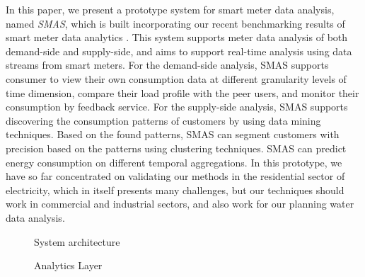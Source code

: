 \documentclass{sig-alternate}
\begin{document}
In this paper, we present a prototype system for smart meter data analysis, named {\em SMAS}, which is built incorporating our recent benchmarking results of smart meter data analytics \cite{benchmarking}. This system supports meter data analysis of both demand-side and supply-side, and aims to support real-time analysis using  data streams from smart meters.  For the demand-side analysis, SMAS supports  consumer to view their own consumption data at different granularity levels of time  dimension, compare their load profile with the peer users, and monitor their consumption by feedback service. For the supply-side analysis, SMAS supports discovering the consumption patterns of customers by using data mining techniques. Based on the found patterns, SMAS can segment customers with precision based on the patterns using clustering techniques. SMAS can predict energy consumption on different temporal aggregations.  In this prototype, we have so far concentrated on validating our methods in the residential sector of electricity, which in itself presents many challenges, but our techniques should work in commercial and industrial sectors, and also work for our planning water data analysis.
\begin{figure}[htp]
\vspace{-5pt}
\begin{minipage}[b]{0.55\linewidth}
\centering
{}
\vspace{-5pt}
\caption{System architecture}
\label{fig:architecture}
\end{minipage}
\hspace{5pt}
\begin{minipage}[b]{0.45\linewidth}
\centering
{}
\vspace{-10pt}
\caption{Analytics Layer}
\label{fig:analyticslayer}
\end{minipage}
\vspace{-25pt}
\end{figure}
\end{document}
